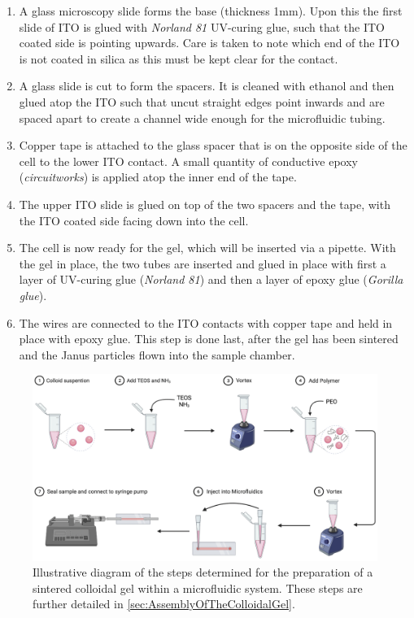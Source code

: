 \begin{enumerate}[label=(\roman*)]
	\item A glass microscopy slide forms the base (thickness 1mm). Upon this the first slide of ITO is glued with \textit{Norland 81} UV-curing glue, such that the ITO coated side is pointing upwards. Care is taken to note which end of the ITO is not coated in silica as this must be kept clear for the contact.
	\item A glass slide is cut to form the spacers. It is cleaned with ethanol  and then glued atop the ITO such that uncut straight edges point inwards and are spaced apart to create a channel wide enough for the microfluidic tubing. 
	\item Copper tape is attached to the glass spacer that is on the opposite side of the cell to the lower ITO contact. A small quantity of conductive epoxy (\textit{circuitworks}) is applied atop the inner end of the tape.
	\item The upper ITO slide is glued on top of the two spacers and the tape, with the ITO coated side facing down into the cell. 
	\item The cell is now ready for the gel, which will be inserted via a pipette. With the gel in place, the two tubes are inserted and glued in place with first a layer of UV-curing glue (\textit{Norland 81}) and then a layer of epoxy glue (\textit{Gorilla glue}).
	\item The wires are connected to the ITO contacts with copper tape and held in place with epoxy glue. This step is done last, after the gel has been sintered and the Janus particles flown into the sample chamber. 
\end{enumerate}




\begin{figure}
	\centering
	\includegraphics[width=\linewidth]{figsExpSystem/figFlowChart.png}
	\caption[Diagram for the preparation of a sintered colloidal gel within a microfluidic system.]{Illustrative diagram of the steps determined for the preparation of a sintered colloidal gel within a microfluidic system. These steps are further detailed in \ref{sec:AssemblyOfTheColloidalGel}.}
	\label{fig:FlowChart}
\end{figure}


